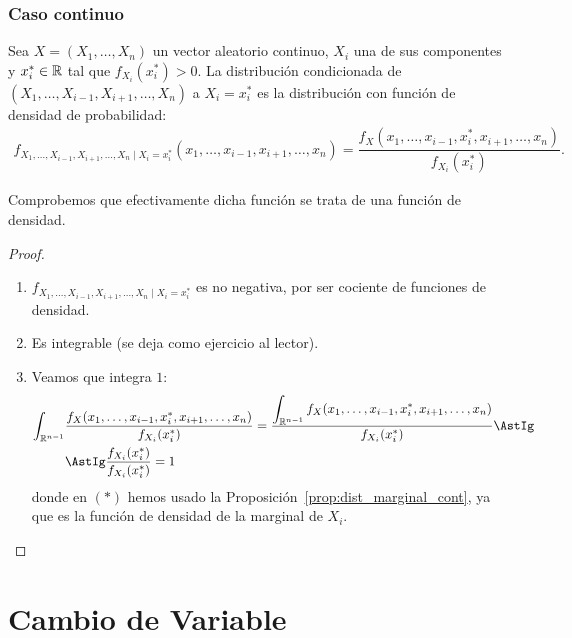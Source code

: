 \subsubsection{Caso continuo}
\begin{definicion}
    Sea $X=(X_1, \ldots, X_n)$ un vector aleatorio continuo, $X_i$ una de sus componentes y $x_i^\ast\in \mathbb{R}$ tal que $f_{X_i}(x_i^\ast)>0$. La distribución condicionada de $(X_1, \ldots, X_{i-1}, X_{i+1}, \ldots, X_n)$ a $X_i=x_i^\ast$ es la distribución con función de densidad de probabilidad:
    \begin{align*}
        f_{X_1, \ldots, X_{i-1}, X_{i+1}, \ldots, X_n \mid X_i=x_i^\ast}(x_1, \ldots, x_{i-1}, x_{i+1}, \ldots, x_n) =
        \dfrac{f_X(x_1, \ldots, x_{i-1}, x_i^\ast, x_{i+1}, \ldots, x_n)}{f_{X_i}(x_i^\ast)}.
    \end{align*}
\end{definicion}

Comprobemos que efectivamente dicha función se trata de una función de densidad.
\begin{proof}~
    \begin{enumerate}
        \item $f_{X_1, \ldots, X_{i-1}, X_{i+1}, \ldots, X_n \mid X_i=x_i^\ast}$ es no negativa, por ser cociente de funciones de densidad.
        \item Es integrable (se deja como ejercicio al lector).
        \item Veamos que integra $1$:
        \begin{align*}
            \int_{\bb{R}^{n-1}}& \dfrac{f_X(x_1, \ldots, x_{i-1}, x_i^\ast, x_{i+1}, \ldots, x_n)}{f_{X_i}(x_i^\ast)} 
            = \dfrac{\displaystyle \int_{\bb{R}^{n-1}} f_X(x_1, \ldots, x_{i-1}, x_i^\ast, x_{i+1}, \ldots, x_n)}{f_{X_i}(x_i^\ast)} 
            \AstIg \\ &\AstIg
            \dfrac{f_{X_i}(x_i^\ast)}{f_{X_i}(x_i^\ast)} = 1
        \end{align*}
        donde en $(\ast)$ hemos usado la Proposición~\ref{prop:dist_marginal_cont}, ya que es la función de densidad de la marginal de $X_i$.
    \end{enumerate}
\end{proof}


\section{Cambio de Variable}

